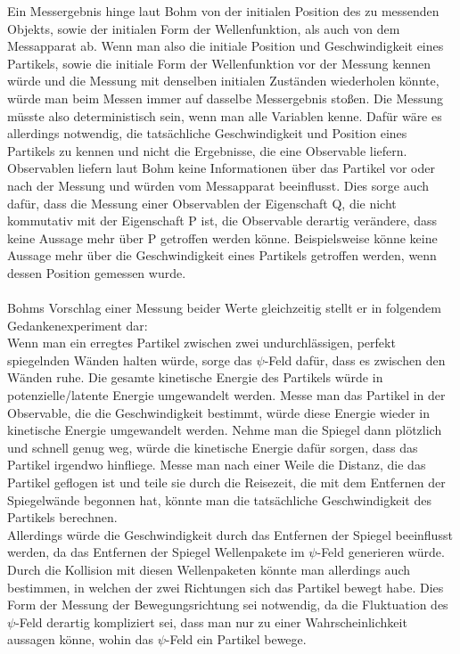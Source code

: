 Ein Messergebnis hinge laut Bohm von der initialen Position des zu messenden Objekts, sowie der initialen Form der Wellenfunktion, als auch von dem Messapparat ab. Wenn man also die initiale Position und Geschwindigkeit eines Partikels, sowie die initiale Form der Wellenfunktion vor der Messung kennen würde und die Messung mit denselben initialen Zuständen wiederholen könnte, würde man beim Messen immer auf dasselbe Messergebnis stoßen. Die Messung müsste also deterministisch sein, wenn man alle Variablen kenne. Dafür wäre es allerdings notwendig, die tatsächliche Geschwindigkeit und Position eines Partikels zu kennen und nicht die Ergebnisse, die eine Observable liefern. Observablen liefern laut Bohm keine Informationen über das Partikel vor oder nach der Messung und würden vom Messapparat beeinflusst. Dies sorge auch dafür, dass die Messung einer Observablen der Eigenschaft Q, die nicht kommutativ mit der Eigenschaft P ist, die Observable derartig verändere, dass keine Aussage mehr über P getroffen werden könne. Beispielsweise könne keine Aussage mehr über die Geschwindigkeit eines Partikels getroffen werden, wenn dessen Position gemessen wurde.\\\\
Bohms Vorschlag einer Messung beider Werte gleichzeitig stellt er in folgendem Gedankenexperiment dar:\\
Wenn man ein erregtes Partikel zwischen zwei undurchlässigen, perfekt spiegelnden Wänden halten würde, sorge das $\psi$-Feld dafür, dass es zwischen den Wänden ruhe. Die gesamte kinetische Energie des Partikels würde in potenzielle/latente Energie umgewandelt werden. Messe man das Partikel in der Observable, die die Geschwindigkeit bestimmt, würde diese Energie wieder in kinetische Energie umgewandelt werden. Nehme man die Spiegel dann plötzlich und schnell genug weg, würde die kinetische Energie dafür sorgen, dass das Partikel irgendwo hinfliege. Messe man nach einer Weile die Distanz, die das Partikel geflogen ist und teile sie durch die Reisezeit, die mit dem Entfernen der Spiegelwände begonnen hat, könnte man die tatsächliche Geschwindigkeit des Partikels berechnen. \\Allerdings würde die Geschwindigkeit durch das Entfernen der Spiegel beeinflusst werden, da das Entfernen der Spiegel Wellenpakete im $\psi$-Feld  generieren würde. Durch die Kollision mit diesen Wellenpaketen könnte man allerdings auch bestimmen, in welchen der zwei Richtungen sich das Partikel bewegt habe. Dies Form der Messung der Bewegungsrichtung sei notwendig, da die Fluktuation des $\psi$-Feld derartig kompliziert sei, dass man nur zu einer Wahrscheinlichkeit aussagen könne, wohin das $\psi$-Feld ein Partikel bewege.
